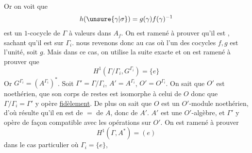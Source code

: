 Or on voit que
\[
h(\unsure{\gamma|\sigma})=g(\gamma)f(\gamma)^{-1}
\]
est un $1$-cocycle de $\Gamma$ à valeurs dans $A_f$. On est ramené à prouver qu'il est , sachant qu'il est  sur $\Gamma_i$.  nous revenons donc au cas où l'un des cocycles $f,g$ est l'unité, soit $g$. Mais dans ce cas, on utilise la suite exacte
et on est ramené à prouver que
\[
H^1(\Gamma/\Gamma_i,G^{\Gamma_i})=\{e\}
\]
Or $G^{\Gamma_i}=(A^{\Gamma_i})^*$. Soit $\Gamma'=\Gamma/\Gamma_i$, $A'=A^{\Gamma_i}$,  $O'=O^{\Gamma_i}$. On sait que $O'$ est  noethérien, que son corps de restes est isomorphe à celui de $O$ donc que $\Gamma/\Gamma_i=\Gamma'$ y opère \uline{fidèlement}. De plus on sait que $O$ est un $O'$-module noethérien, d'où résulte qu'il en est de $=$ de $A$, donc de $A'$. $A'$ est une $O'$-algèbre, et $\Gamma'$ y opère de façon compatible avec les opérations sur $O'$. On est ramené à prouver
\[
H^1(\Gamma,A^*)=(e)
\]
 dans le cas particulier où $\Gamma_i=\{e\}$,
